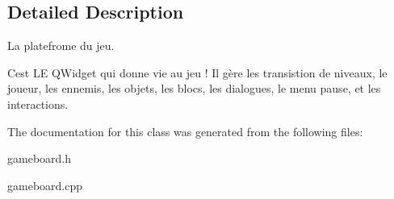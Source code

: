 \subsection{Detailed Description}
La platefrome du jeu. 

C\textquotesingle{}est L\+E Q\+Widget qui donne vie au jeu ! Il gère les transistion de niveaux, le joueur, les ennemis, les objets, les blocs, les dialogues, le menu pause, et les interactions. 

The documentation for this class was generated from the following files\+:\begin{DoxyCompactItemize}
\item 
gameboard.\+h\item 
gameboard.\+cpp\end{DoxyCompactItemize}
